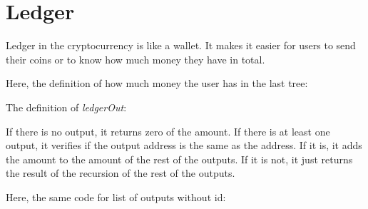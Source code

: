 \section{Ledger}

Ledger in the cryptocurrency is like a wallet.
It makes it easier for users to send their coins or to know how much money they have in total.

Here, the definition of how much money the user has in the last tree:


The definition of \emph{ledgerOut}:


If there is no output, it returns zero of the amount.
If there is at least one output, it verifies if the output address is the same as the address.
If it is, it adds the amount to the amount of the rest of the outputs.
If it is not, it just returns the result of the recursion of the rest of the outputs.

Here, the same code for list of outputs without id:

